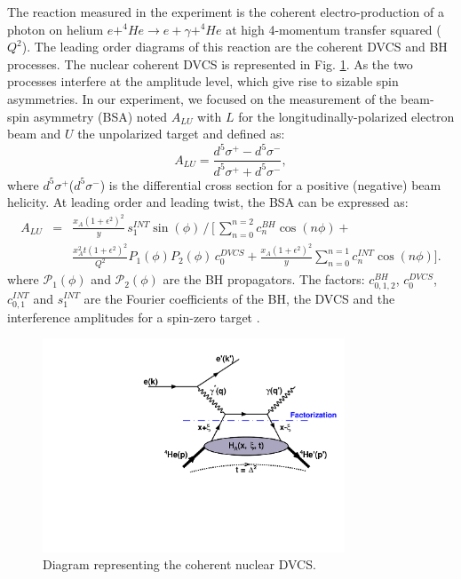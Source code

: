 \documentclass[aps,prc,preprint,superscriptaddress]{revtex4}
\begin{document}
The reaction measured in the experiment is the coherent electro-production of a photon on helium
$e+^4\!\!He \rightarrow e+\gamma+^4\!\!He$ at high 4-momentum transfer squared ($Q^2$). The 
leading order diagrams
of this reaction are the coherent DVCS and BH processes. The nuclear coherent DVCS is 
represented in Fig. \ref{fig:CohDiag}. As  
the two processes interfere at the amplitude level, which give rise to sizable spin asymmetries.
In our experiment, we focused on the measurement of the beam-spin asymmetry (BSA) noted $A_{LU}$ with 
$L$ for the longitudinally-polarized electron beam and $U$ the unpolarized target and defined as:  
\begin{equation}
A_{LU} = \frac{d^{5}\sigma^{+} - d^{5}\sigma^{-} }
              {d^{5}\sigma^{+} + d^{5}\sigma^{-}},
  \label{eq:BSA}
\end{equation}
where $d^{5}\sigma^{+}$($d^{5}\sigma^{-}$) is the differential cross section for a positive 
(negative) beam helicity. At leading order and leading twist, the BSA can be expressed as:        
\begin{eqnarray}
A_{LU}& =& \frac{x_A(1+\epsilon^2)^2}{y} \, s_1^{INT} \sin(\phi) \, 
\bigg/ \, \bigg[ \, \sum_{n=0}^{n=2}c_n^{BH}\cos{(n\phi)} +  \\
& & \frac{x_A^2 t {(1+\epsilon^2)}^2}{Q^2} P_1(\phi) P_2(\phi) \, c_0^{DVCS} + 
\frac{x_A (1+\epsilon^2)^2}{y} \sum_{n=0}^{n=1} c_n^{INT} \cos{(n\phi)} \bigg].  \nonumber 
\label{eq:coh_BSA}
\end{eqnarray}
where $\mathcal{P}_1(\phi)$ and $\mathcal {P}_2(\phi)$ are the BH 
propagators. The factors: $c_{0,1,2}^{BH}$, $c_0^{DVCS}$, $c_{0,1}^{INT}$ and 
$s_1^{INT}$ are the Fourier coefficients of the BH, the DVCS and the 
interference amplitudes for a spin-zero target \cite{Kirchner:2003wt}. %

\begin{figure}[tbp!]
\center
\includegraphics[width=9cm]{fig3/DVCS_diagram.pdf}
\caption{Diagram representing the coherent nuclear DVCS.}
\label{fig:CohDiag}
\end{figure}
\end{document}
